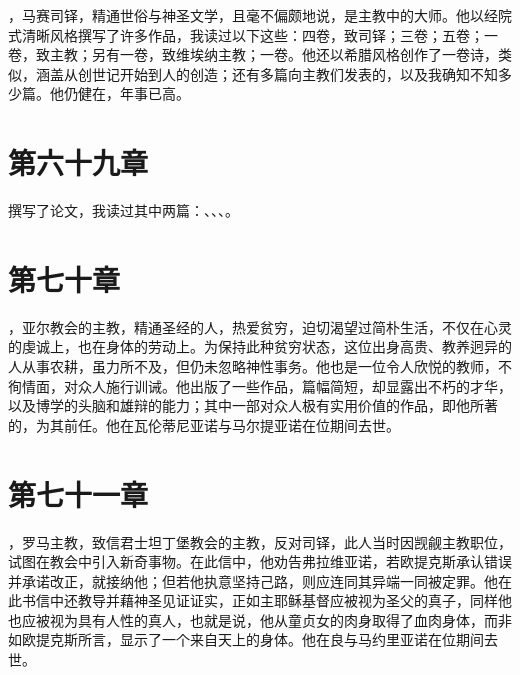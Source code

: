 ，马赛司铎，精通世俗与神圣文学，且毫不偏颇地说，是主教中的大师。他以经院式清晰风格撰写了许多作品，我读过以下这些：四卷，致司铎；三卷；五卷；一卷，致主教；另有一卷，致维埃纳主教；一卷。他还以希腊风格创作了一卷诗，类似，涵盖从创世记开始到人的创造；还有多篇向主教们发表的，以及我确知不知多少篇。他仍健在，年事已高。\par


\section{第六十九章}

撰写了论文，我读过其中两篇：、、、。\par


\section{第七十章}

，亚尔教会的主教，精通圣经的人，热爱贫穷，迫切渴望过简朴生活，不仅在心灵的虔诚上，也在身体的劳动上。为保持此种贫穷状态，这位出身高贵、教养迥异的人从事农耕，虽力所不及，但仍未忽略神性事务。他也是一位令人欣悦的教师，不徇情面，对众人施行训诫。他出版了一些作品，篇幅简短，却显露出不朽的才华，以及博学的头脑和雄辩的能力；其中一部对众人极有实用价值的作品，即他所著的，为其前任。他在瓦伦蒂尼亚诺与马尔提亚诺在位期间去世。\par


\section{第七十一章}

，罗马主教，致信君士坦丁堡教会的主教，反对司铎，此人当时因觊觎主教职位，试图在教会中引入新奇事物。在此信中，他劝告弗拉维亚诺，若欧提克斯承认错误并承诺改正，就接纳他；但若他执意坚持己路，则应连同其异端一同被定罪。他在此书信中还教导并藉神圣见证证实，正如主耶稣基督应被视为圣父的真子，同样他也应被视为具有人性的真人，也就是说，他从童贞女的肉身取得了血肉身体，而非如欧提克斯所言，显示了一个来自天上的身体。他在良与马约里亚诺在位期间去世。\par

